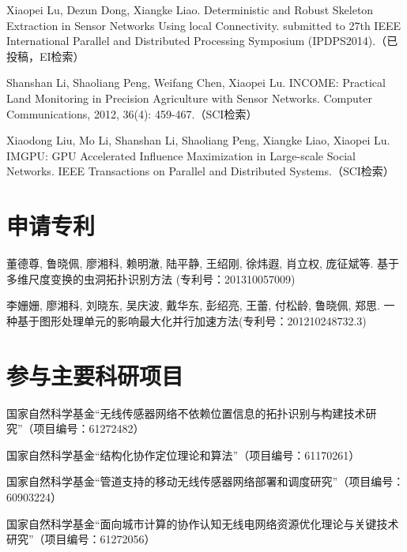 \begin{resume}
\begin{enumerate}[{[}1{]}]
  \item Xiaopei Lu, Dezun Dong, Xiangke Liao. Deterministic and Robust Skeleton Extraction in Sensor Networks Using local Connectivity. submitted to 27th IEEE International Parallel and Distributed Processing Symposium (IPDPS2014).（已投稿，EI检索）
  \item Shanshan Li, Shaoliang Peng, Weifang Chen, Xiaopei Lu. INCOME: Practical Land Monitoring in Precision Agriculture with Sensor Networks. Computer Communications, 2012, 36(4): 459-467.（SCI检索）
  \item Xiaodong Liu, Mo Li, Shanshan Li, Shaoliang Peng, Xiangke Liao, Xiaopei Lu. IMGPU: GPU Accelerated Influence Maximization in Large-scale Social Networks. IEEE Transactions on Parallel and Distributed Systems.（SCI检索）
  \end{enumerate}

  \section*{申请专利} %
  \begin{enumerate}[{[}1{]}]
  \addtolength{\itemsep}{-.36\baselineskip}%
  \item 董德尊, 鲁晓佩, 廖湘科, 赖明澈, 陆平静, 王绍刚, 徐炜遐, 肖立权, 庞征斌等. 基于多维尺度变换的虫洞拓扑识别方法 (专利号：201310057009)
  \item 李姗姗, 廖湘科, 刘晓东, 吴庆波, 戴华东, 彭绍亮, 王蕾, 付松龄, 鲁晓佩, 郑思. 一种基于图形处理单元的影响最大化并行加速方法(专利号：201210248732.3)
  \end{enumerate}

  \section*{参与主要科研项目} %
  \begin{enumerate}[{[}1{]}]
  \addtolength{\itemsep}{-.36\baselineskip}%
  \item 国家自然科学基金“无线传感器网络不依赖位置信息的拓扑识别与构建技术研究”（项目编号：61272482）
  \item 国家自然科学基金“结构化协作定位理论和算法”（项目编号：61170261）
  \item 国家自然科学基金“管道支持的移动无线传感器网络部署和调度研究”（项目编号：60903224）
  \item 国家自然科学基金“面向城市计算的协作认知无线电网络资源优化理论与关键技术研究”（项目编号：61272056）
  \end{enumerate}
\end{resume}
